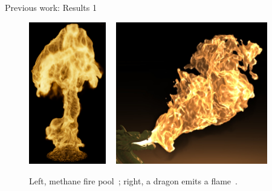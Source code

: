 \documentclass{beamer}
\begin{document}
\begin{frame}{Previous work: Results 1}

\begin{figure}[t!]
\begin{center}
\includegraphics[width=0.3\textwidth]{img/pegoraro_2006} 
~
\includegraphics[width=0.59\textwidth]{img/hong_2007}
\caption*{\tiny{Left, methane fire pool~\cite{Pegoraro:2006}; right, a dragon emits a flame~\cite{Hong:2007}.}}
\end{center}
\end{figure}

\end{frame}
\end{document}
